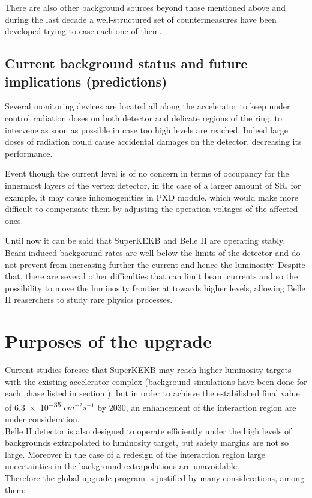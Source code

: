 There are also other  background sources beyond those mentioned above and during the last decade a well-structured set of countermeasures have been developed trying to ease each one of them.


\subsection{Current background status and future implications (predictions)}

Several monitoring devices are located all along the accelerator to keep under control radiation doses on both detector and delicate regions of the ring, to intervene as soon as possible in case too high levels are reached. Indeed large doses of radiation could cause accidental damages on the detector, decreasing its performance.

Event though the current level is of no concern in terms of occupancy for the innermost layers of the vertex detector, in the case of a larger amount of SR, for example, it may cause inhomogenities in PXD module, which would make more difficult to compensate them by adjusting the operation voltages of the affected ones.

Until now it can be said that SuperKEKB and Belle II are operating stably. Beam-induced backgorund rates are well below the limits of the detector and do not prevent from increasing further the current and hence the luminosity.  
Despite that, there are several other difficulties that can limit beam currents and so the possibility to move the luminosity frontier at towards higher levels, allowing Belle II reaserchers to study rare physics processes. 



\section{Purposes of the upgrade}

Current studies foresee that SuperKEKB may reach higher luminosity targets with the existing accelerator complex (background simulations have been done for each phase listed in section ), but in order to achieve the estabilished final value of  \num{6.3e-35} $cm^{-2} s^{-1}$ by 2030, an enhancement of the interaction region are under consideration.\\

Belle II detector is also designed to operate efficiently under the high levels of backgrounds extrapolated to luminosity target, but safety margins are not so large. Moreover in the case of a redesign of the interaction region large uncertainties in the background extrapolations are unavoidable. \\
Therefore the global upgrade program is justified by many considerations, among them:

